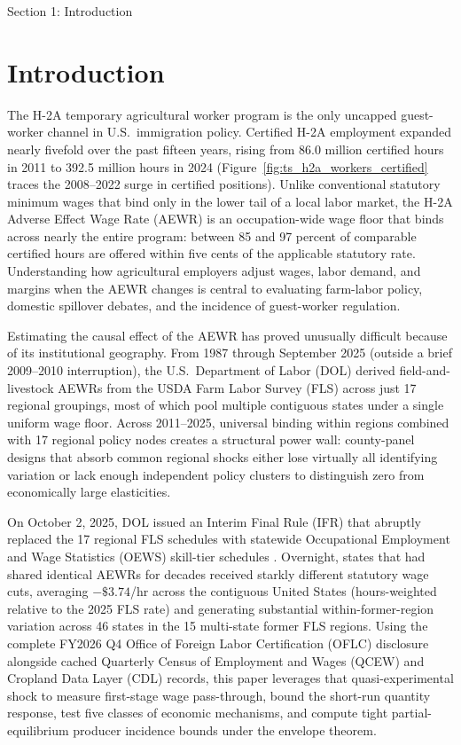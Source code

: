 \begin{llmdraft}{Section 1: Introduction}
\section{Introduction}
\label{sec:introduction}

The H-2A temporary agricultural worker program is the only uncapped guest-worker
channel in U.S.\ immigration policy. Certified H-2A employment expanded nearly
fivefold over the past fifteen years, rising from 86.0 million certified hours
in 2011 to 392.5 million hours in 2024 (Figure~\ref{fig:ts_h2a_workers_certified}
traces the 2008--2022 surge in certified positions). Unlike conventional
statutory minimum wages that bind only in the lower tail of a local labor
market, the H-2A Adverse Effect Wage Rate (AEWR) is an occupation-wide wage
floor that binds across nearly the entire program: between 85 and 97 percent of
comparable certified hours are offered within five cents of the applicable
statutory rate. Understanding how agricultural employers adjust wages, labor
demand, and margins when the AEWR changes is central to evaluating farm-labor
policy, domestic spillover debates, and the incidence of guest-worker
regulation.

Estimating the causal effect of the AEWR has proved unusually difficult because
of its institutional geography. From 1987 through September 2025 (outside a
brief 2009--2010 interruption), the U.S.\ Department of Labor (DOL) derived
field-and-livestock AEWRs from the USDA Farm Labor Survey (FLS) across just 17
regional groupings, most of which pool multiple contiguous states under a
single uniform wage floor. Across 2011--2025, universal binding within regions
combined with 17 regional policy nodes creates a structural power wall:
county-panel designs that absorb common regional shocks either lose virtually
all identifying variation or lack enough independent policy clusters to
distinguish zero from economically large elasticities.

On October 2, 2025, DOL issued an Interim Final Rule (IFR) that abruptly
replaced the 17 regional FLS schedules with statewide Occupational Employment
and Wage Statistics (OEWS) skill-tier schedules \citep{dol_2025_ifr}. Overnight,
states that had shared identical AEWRs for decades received starkly different
statutory wage cuts, averaging $-\$3.74$/hr across the contiguous United States
(hours-weighted relative to the 2025 FLS rate) and generating substantial
within-former-region variation across 46 states in the 15 multi-state former FLS regions. Using the complete FY2026 Q4
Office of Foreign Labor Certification (OFLC) disclosure alongside cached
Quarterly Census of Employment and Wages (QCEW) and Cropland Data Layer (CDL)
records, this paper leverages that quasi-experimental shock to measure
first-stage wage pass-through, bound the short-run quantity response, test five
classes of economic mechanisms, and compute tight partial-equilibrium producer
incidence bounds under the envelope theorem.


\end{llmdraft}
